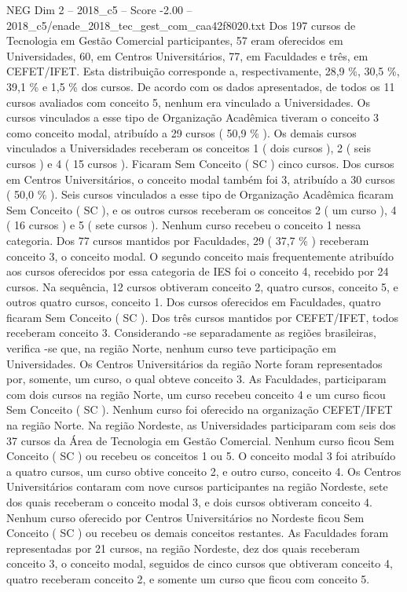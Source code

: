 \begin{textsample}{NEG Dim 2 – 2018\_c5 – Score -2.00 – 2018\_c5/enade\_2018\_tec\_gest\_com\_caa42f8020.txt}
Dos 197 cursos de Tecnologia em Gestão Comercial participantes, 57 eram oferecidos em Universidades, 60, em Centros Universitários, 77, em Faculdades e três, em CEFET/IFET.
Esta distribuição corresponde a, respectivamente, 28,9 \%, 30,5 \%, 39,1 \% e 1,5 \% dos cursos.
De acordo com os dados apresentados, de todos os 11 cursos avaliados com conceito 5, nenhum era vinculado a Universidades.
Os cursos vinculados a esse tipo de Organização Acadêmica tiveram o conceito 3 como conceito modal, atribuído a 29 cursos ( 50,9 \% ).
Os demais cursos vinculados a Universidades receberam os conceitos 1 ( dois cursos ), 2 ( seis cursos ) e 4 ( 15 cursos ).
Ficaram Sem Conceito ( SC ) cinco cursos.
Dos cursos em Centros Universitários, o conceito modal também foi 3, atribuído a 30 cursos ( 50,0 \% ).
Seis cursos vinculados a esse tipo de Organização Acadêmica ficaram Sem Conceito ( SC ), e os outros cursos receberam os conceitos 2 ( um curso ), 4 ( 16 cursos ) e 5 ( sete cursos ).
Nenhum curso recebeu o conceito 1 nessa categoria.
Dos 77 cursos mantidos por Faculdades, 29 ( 37,7 \% ) receberam conceito 3, o conceito modal.
O segundo conceito mais frequentemente atribuído aos cursos oferecidos por essa categoria de IES foi o conceito 4, recebido por 24 cursos.
Na sequência, 12 cursos obtiveram conceito 2, quatro cursos, conceito 5, e outros quatro cursos, conceito 1.
Dos cursos oferecidos em Faculdades, quatro ficaram Sem Conceito ( SC ).
Dos três cursos mantidos por CEFET/IFET, todos receberam conceito 3.
Considerando -se separadamente as regiões brasileiras, verifica -se que, na região Norte, nenhum curso teve participação em Universidades.
Os Centros Universitários da região Norte foram representados por, somente, um curso, o qual obteve conceito 3.
As Faculdades, participaram com dois cursos na região Norte, um curso recebeu conceito 4 e um curso ficou Sem Conceito ( SC ).
Nenhum curso foi oferecido na organização CEFET/IFET na região Norte.
Na região Nordeste, as Universidades participaram com seis dos 37 cursos da Área de Tecnologia em Gestão Comercial.
Nenhum curso ficou Sem Conceito ( SC ) ou recebeu os conceitos 1 ou 5.
O conceito modal 3 foi atribuído a quatro cursos, um curso obtive conceito 2, e outro curso, conceito 4.
Os Centros Universitários contaram com nove cursos participantes na região Nordeste, sete dos quais receberam o conceito modal 3, e dois cursos obtiveram conceito 4.
Nenhum curso oferecido por Centros Universitários no Nordeste ficou Sem Conceito ( SC ) ou recebeu os demais conceitos restantes.
As Faculdades foram representadas por 21 cursos, na região Nordeste, dez dos quais receberam conceito 3, o conceito modal, seguidos de cinco cursos que obtiveram conceito 4, quatro receberam conceito 2, e somente um curso que ficou com conceito 5.

\end{textsample}
